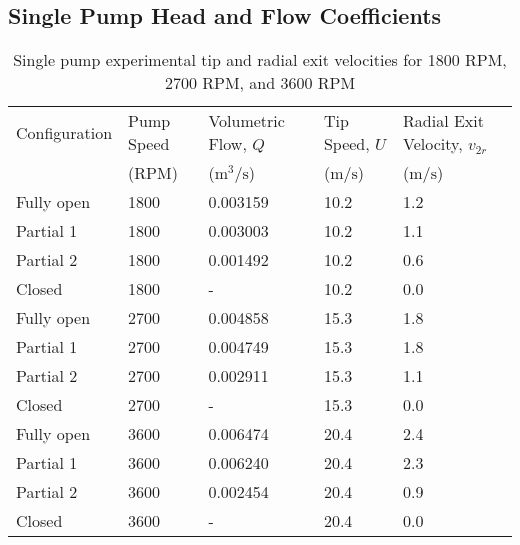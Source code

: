 \subsection{Single Pump Head and Flow Coefficients}
\begin{table}[H]
    \centering
    \caption{Single pump experimental tip and radial exit velocities for 1800 RPM, 2700 RPM, and 3600 RPM}
    \label{tab:single_pump_tip_and_radial_exit_velocities}
    \begin{tabular}{lC{0.15\textwidth}C{0.15\textwidth}C{0.15\textwidth}C{0.15\textwidth}}
    \toprule
    Configuration & Pump Speed & Volumetric Flow, $Q$ & Tip Speed, $U$ & Radial Exit Velocity, $v_{2r}$ \\
    & (RPM) & ($\unit{\meter\cubed\per\second}$) & ($\unit{\meter\per\second}$) & ($\unit{\meter\per\second}$) \\
    \midrule
    Fully open & 1800 & 0.003159 & 10.2 & 1.2 \\
    Partial 1 & 1800 & 0.003003 & 10.2 & 1.1 \\
    Partial 2 & 1800 & 0.001492 & 10.2 & 0.6 \\
    Closed & 1800 & - & 10.2 & 0.0 \\
    Fully open & 2700 & 0.004858 & 15.3 & 1.8 \\
    Partial 1 & 2700 & 0.004749 & 15.3 & 1.8 \\
    Partial 2 & 2700 & 0.002911 & 15.3 & 1.1 \\
    Closed & 2700 & - & 15.3 & 0.0 \\
    Fully open & 3600 & 0.006474 & 20.4 & 2.4 \\
    Partial 1 & 3600 & 0.006240 & 20.4 & 2.3 \\
    Partial 2 & 3600 & 0.002454 & 20.4 & 0.9 \\
    Closed & 3600 & - & 20.4 & 0.0 \\
    \bottomrule
    \end{tabular}
\end{table}
